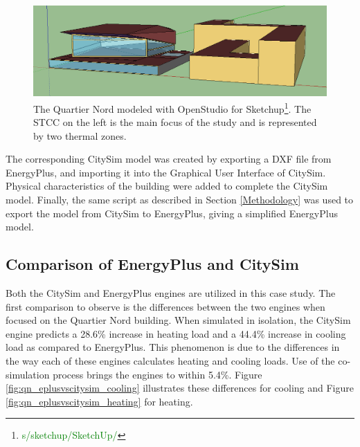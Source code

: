 \documentclass{tBPS2e}
\theoremstyle{plain}
\theoremstyle{definition}
\theoremstyle{remark}
\newcommand{\noteDT}[1]{\footnote{\textcolor{green}{#1}}}
\begin{document}
\begin{figure}[H]
\centering
\includegraphics[width=\textwidth]{figures/model_yang}
\caption{The Quartier Nord modeled with OpenStudio for
Sketchup\noteDT{s/sketchup/SketchUp/}. The STCC on the left is the main focus
of the study and is represented by two thermal zones.}
\label{fig:model_yang}
\end{figure}

The corresponding CitySim model was created by exporting a DXF file from
EnergyPlus, and importing it into the Graphical User Interface of CitySim.
Physical characteristics of the building were added to complete the CitySim
model. Finally, the same script as described in Section \ref{Methodology} was
used to export the model from CitySim to EnergyPlus, giving a simplified
EnergyPlus model.\\



\subsection{Comparison of EnergyPlus and CitySim}

Both the CitySim and EnergyPlus engines are utilized in this case study. The
first comparison to observe is the differences between the two engines when
focused on the Quartier Nord building. When simulated in isolation, the
CitySim engine predicts a 28.6\% increase in heating load and a 44.4\%
increase in cooling load as compared to EnergyPlus. This phenomenon is due to
the differences in the way each of these engines calculates heating and
cooling loads. Use of the co-simulation process brings the engines to within
5.4\%. Figure \ref{fig:qn_eplusvscitysim_cooling} illustrates these
differences for cooling and Figure \ref{fig:qn_eplusvscitysim_heating} for
heating.
\end{document}
